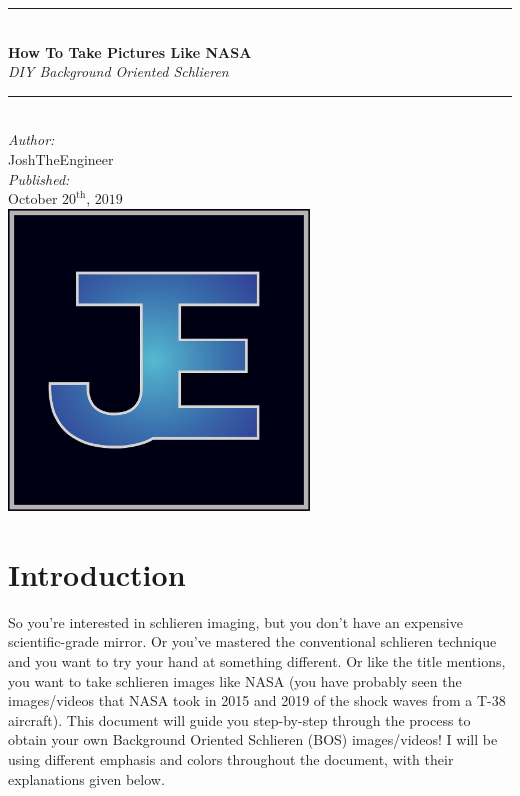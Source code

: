 \documentclass[letterpaper,12pt]{article}
\newcommand{\HRule}{\rule{\linewidth}{0.5mm}} 	%
\begin{document}
\begin{titlepage}


\center

\HRule \\[0.6cm]
{ \huge \textbf{How To Take Pictures Like NASA} \\[0.4cm] \textit{DIY Background Oriented Schlieren}}\\[0.4cm]
\HRule \\[1.5cm]

\Large \emph{Author:}\\
JoshTheEngineer\\[1cm]

\Large \emph{Published:}\\
October $20^\text{th}$, $2019$ \\[3cm]

\includegraphics[width=8cm]{JTE_Logo.png}\\[1cm]

\vfill

\end{titlepage}

\section{Introduction}
\label{sec:Introduction}

So you're interested in schlieren imaging, but you don't have an expensive scientific-grade mirror.  Or you've mastered the conventional schlieren technique and you want to try your hand at something different.  Or like the title mentions, you want to take schlieren images like NASA (you have probably seen the images/videos that NASA took in 2015 \cite{2015_NASA_BOS} and 2019 \cite{2019_NASA_BOS} of the shock waves from a T-38 aircraft).  This document will guide you step-by-step through the process to obtain your own Background Oriented Schlieren (BOS) images/videos!  I will be using different emphasis and colors throughout the document, with their explanations given below.
\end{document}
